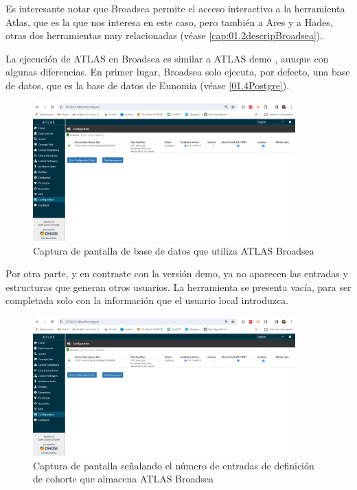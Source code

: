     Es interesante notar que Broadsea permite el acceso interactivo a la herramienta Atlas, que es la que nos interesa en este caso, pero también a Ares y a Hades, otras dos herramientas muy relacionadas (véase \ref{cap:01.2descripBroadsea}).

    La ejecución de ATLAS en Broadsea es similar a ATLAS demo \cite{atlasDEMO}, aunque con algunas diferencias. En primer lugar, Broadsea solo ejecuta, por defecto, una base de datos, que es la base de datos de Eunomia (véase \ref{01.4Postgre}).

\begin{figure}[H]
    \centering
    \includegraphics[width=0.90\textwidth]{figures/atlasBroadseaDB.png}
     \caption{Captura de pantalla de base de datos que utiliza ATLAS Broadsea}
    \label{fig:atlasBroadseaDB}
\end{figure}

    Por otra parte, y en contraste con la versión demo, ya no aparecen las entradas y estructuras que generan otros usuarios. La herramienta se presenta vacía, para ser completada solo con la información que el usuario local introduzca.

\begin{figure}[H]
    \centering
    \includegraphics[width=0.90\textwidth]{figures/atlasBroadseaDB.png}
     \caption{Captura de pantalla señalando el número de entradas de definición de cohorte que almacena ATLAS Broadsea}
    \label{fig:atlasBroadseaDB}
\end{figure}
    

